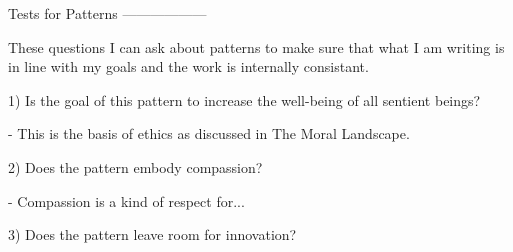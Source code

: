 Tests for Patterns
------------------

These questions I can ask about patterns to make sure that what I am writing is in line with my goals and the work is internally consistant.


1) Is the goal of this pattern to increase the well-being of all sentient beings?

	- This is the basis of ethics as discussed in The Moral Landscape.

2) Does the pattern embody compassion?

	- Compassion is a kind of respect for...

3) Does the pattern leave room for innovation?

